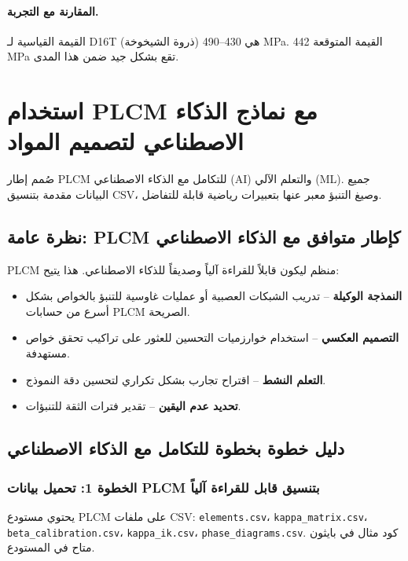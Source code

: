\documentclass[11pt,a4paper]{article}
\begin{document}
\begin{otherlanguage}{arabic}
		\paragraph{المقارنة مع التجربة.}
		القيمة القياسية لـ D16T (ذروة الشيخوخة) هي 430–490 MPa. القيمة المتوقعة 442 MPa تقع بشكل جيد ضمن هذا المدى.
		
		\section{استخدام PLCM مع نماذج الذكاء الاصطناعي لتصميم المواد}
		\label{sec:ai-integration}
		
		صُمم إطار PLCM للتكامل مع الذكاء الاصطناعي (AI) والتعلم الآلي (ML). جميع البيانات مقدمة بتنسيق CSV، وصيغ التنبؤ معبر عنها بتعبيرات رياضية قابلة للتفاضل.
		
		\subsection{نظرة عامة: PLCM كإطار متوافق مع الذكاء الاصطناعي}
		
		PLCM منظم ليكون قابلاً للقراءة آلياً وصديقاً للذكاء الاصطناعي. هذا يتيح:
		\begin{itemize}
			\item \textbf{النمذجة الوكيلة} – تدريب الشبكات العصبية أو عمليات غاوسية للتنبؤ بالخواص بشكل أسرع من حسابات PLCM الصريحة.
			\item \textbf{التصميم العكسي} – استخدام خوارزميات التحسين للعثور على تراكيب تحقق خواص مستهدفة.
			\item \textbf{التعلم النشط} – اقتراح تجارب بشكل تكراري لتحسين دقة النموذج.
			\item \textbf{تحديد عدم اليقين} – تقدير فترات الثقة للتنبؤات.
		\end{itemize}
		
		\subsection{دليل خطوة بخطوة للتكامل مع الذكاء الاصطناعي}
		
		\subsubsection{الخطوة 1: تحميل بيانات PLCM بتنسيق قابل للقراءة آلياً}
		يحتوي مستودع PLCM على ملفات CSV: \texttt{elements.csv}، \texttt{kappa\_matrix.csv}، \texttt{beta\_calibration.csv}، \texttt{kappa\_ik.csv}، \texttt{phase\_diagrams.csv}. كود مثال في بايثون متاح في المستودع.
		

\end{otherlanguage}
\end{document}
